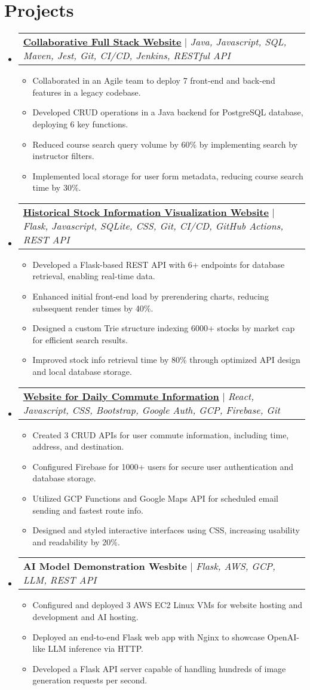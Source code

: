 \documentclass[letterpaper,11pt]{article}
\makeatletter
\newcommand{\resumeItem}[1]{
  \item\small{
    {#1 \vspace{-2pt}}
  }
}
\newcommand{\resumeProjectHeading}[2]{
    \item
    \begin{tabular*}{0.97\textwidth}{l@{\extracolsep{\fill}}r}
      \small#1 & #2 \\
    \end{tabular*}\vspace{-7pt}
}
\newcommand{\resumeSubHeadingListStart}{\begin{itemize}[leftmargin=0.15in, label={}]}
\newcommand{\resumeSubHeadingListEnd}{\end{itemize}}
\newcommand{\resumeItemListStart}{\begin{itemize}}
\newcommand{\resumeItemListEnd}{\end{itemize}\vspace{-5pt}}
\makeatother
\begin{document}
\section{\textbf{Projects}}
    \resumeSubHeadingListStart
        \resumeProjectHeading
            {\href{https://github.com/ucsb-cs156-s23/proj-courses-s23-7pm-2}
            {\underline{\textbf{Collaborative Full Stack Website}}} 
            $|$ \emph{Java, Javascript, SQL, Maven, Jest, Git, CI/CD, Jenkins, RESTful API}}{}
            \resumeItemListStart
            \resumeItem{Collaborated in an Agile team to deploy 7 front-end and back-end features in a legacy codebase.}
            \resumeItem{Developed CRUD operations in a Java backend for PostgreSQL database, deploying 6 key functions.}
            \resumeItem{Reduced course search query volume by 60\% by implementing search by instructor filters.}
            \resumeItem{Implemented local storage for user form metadata, reducing course search time by 30\%.}
        \resumeItemListEnd
        \resumeProjectHeading
            {\href{https://github.com/JNewman-cell/StockProjects}{\underline{\textbf{Historical Stock Information Visualization Website}}} 
            $|$ \emph{Flask, Javascript, SQLite, CSS, Git, CI/CD, GitHub Actions, REST API}}{}
            \resumeItemListStart
            \resumeItem{Developed a Flask-based REST API with 6+ endpoints for database retrieval, enabling real-time data.}
            \resumeItem{Enhanced initial front-end load by prerendering charts, reducing subsequent render times by 40\%.}
            \resumeItem{Designed a custom Trie structure indexing 6000+ stocks by market cap for efficient search results.}
            \resumeItem{Improved stock info retrieval time by 80\% through optimized API design and local database storage.}
        \resumeItemListEnd
        \resumeProjectHeading
            {\href{https://github.com/JNewman-cell/CommuterHelper}{\underline{\textbf{Website for Daily Commute Information}}}
            $|$ \emph{React, Javascript, CSS, Bootstrap, Google Auth, GCP, Firebase, Git}}{}
            \resumeItemListStart
            \resumeItem{Created 3 CRUD APIs for user commute information, including time, address, and destination.}
            \resumeItem{Configured Firebase for 1000+ users for secure user authentication and database storage.}
            \resumeItem{Utilized GCP Functions and Google Maps API for scheduled email sending and fastest route info.}
            \resumeItem{Designed and styled interactive interfaces using CSS, increasing usability and readability by 20\%.}
        \resumeItemListEnd
        \resumeProjectHeading
            {\textbf{AI Model Demonstration Wesbite}
            $|$ \emph{Flask, AWS, GCP, LLM, REST API}}{}
            \resumeItemListStart
            \resumeItem{Configured and deployed 3 AWS EC2 Linux VMs for website hosting and development and AI hosting.}
            \resumeItem{Deployed an end-to-end Flask web app with Nginx to showcase OpenAI-like LLM inference via HTTP.}
            \resumeItem{Developed a Flask API server capable of handling hundreds of image generation requests per second.}
        \resumeItemListEnd
    \resumeSubHeadingListEnd
\end{document}
